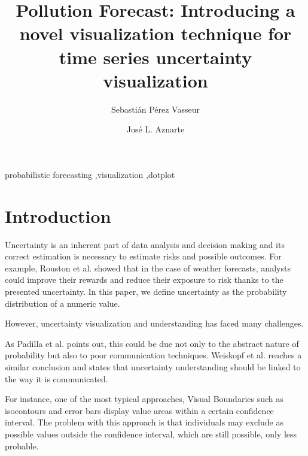 \documentclass[a4paper,3p,sort&compress]{elsarticle}
\begin{document}
\linenumbers

\newcommand{\no}{NO\textsubscript{2}\xspace}

\begin{frontmatter}

  \title{Pollution Forecast: Introducing a novel visualization technique for time series uncertainty visualization}


  \author{Sebasti\'an P\'erez Vasseur}
  \author{Jos\'e L. Aznarte}
  \address{Artificial Intelligence Department\\Universidad Nacional de
    Educaci\'on a Distancia --- UNED\\c/ Juan del Rosal, 16, Madrid, Spain}
  

\begin{abstract}
  
\end{abstract}

\begin{keyword}
probabilistic forecasting \sep visualization \sep dotplot
\end{keyword}

\end{frontmatter}


\section{Introduction}
\label{sec:intro}

Uncertainty is an inherent part of data analysis and decision making and its correct estimation 
is necessary to estimate risks and possible outcomes. For example, Rouston et al. showed that 
in the case of weather forecasts, analysts could improve their rewards and reduce their exposure 
to risk thanks to the presented uncertainty. In this paper, we define uncertainty as the probability 
distribution of a numeric value.

However, uncertainty visualization and understanding has faced many challenges. 

As Padilla et al. points out, this could be due not only to the abstract nature of probability 
but also to poor communication techniques. Weiskopf et al. reaches a similar conclusion and states 
that uncertainty understanding should be linked to the way it is communicated.

For instance, one of the most typical approaches, Visual Boundaries such as isocontours and error 
bars display value areas within a certain  confidence interval. The problem with this approach is 
that individuals may exclude as possible values outside the confidence interval, which are still 
possible, only less probable. 
\end{document}
